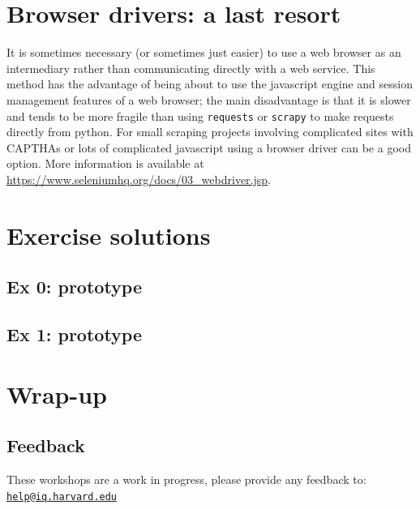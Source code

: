\documentclass[]{book}
\begin{document}
\hypertarget{browser-drivers-a-last-resort}{%
\section{Browser drivers: a last resort}\label{browser-drivers-a-last-resort}}

It is sometimes necessary (or sometimes just easier) to use a web
browser as an intermediary rather than communicating directly with a
web service. This method has the advantage of being about to use the
javascript engine and session management features of a web browser;
the main disadvantage is that it is slower and tends to be more
fragile than using \texttt{requests} or \texttt{scrapy} to make requests directly
from python. For small scraping projects involving complicated sites
with CAPTHAs or lots of complicated javascript using a browser driver
can be a good option. More information is available at
\url{https://www.seleniumhq.org/docs/03_webdriver.jsp}.

\hypertarget{exercise-solutions-5}{%
\section{Exercise solutions}\label{exercise-solutions-5}}

\hypertarget{ex-0-prototype-5}{%
\subsection{Ex 0: prototype}\label{ex-0-prototype-5}}

\hypertarget{ex-1-prototype-5}{%
\subsection{Ex 1: prototype}\label{ex-1-prototype-5}}

\hypertarget{wrap-up-6}{%
\section{Wrap-up}\label{wrap-up-6}}

\hypertarget{feedback-6}{%
\subsection{Feedback}\label{feedback-6}}

These workshops are a work in progress, please provide any feedback to: \href{mailto:help@iq.harvard.edu}{\nolinkurl{help@iq.harvard.edu}}
\end{document}
